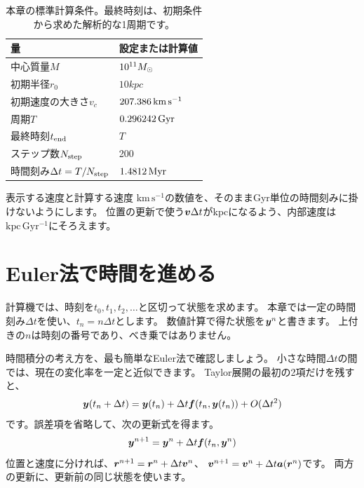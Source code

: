 \begin{table}[!htbp]
\centering
\caption{本章の標準計算条件。最終時刻は、初期条件から求めた解析的な1周期です。}
\label{tab:ch1-parameters}
\begin{tabular}{ll}
\toprule
量 & 設定または計算値\\
\midrule
中心質量$M$ & $10^{11}M_\odot$\\
初期半径$r_0$ & $10\unit{kpc}$\\
初期速度の大きさ$v_c$ & $207.386\,\mathrm{km\,s^{-1}}$\\
周期$T$ & $0.296242\,\mathrm{Gyr}$\\
最終時刻$t_{\rm end}$ & $T$\\
ステップ数$N_{\rm step}$ & 200\\
時間刻み$\Delta t=T/N_{\rm step}$ & $1.4812\,\mathrm{Myr}$\\
\bottomrule
\end{tabular}
\end{table}

\begin{failbox}{表示する速度と計算する速度}
$\mathrm{km\,s^{-1}}$の数値を、そのままGyr単位の時間刻みに掛けないようにします。
位置の更新で使う$\boldsymbol v\Delta t$がkpcになるよう、内部速度は$\mathrm{kpc\,Gyr^{-1}}$にそろえます。
\end{failbox}

\section{Euler法で時間を進める}
\label{sec:ch1-euler}

計算機では、時刻を$t_0,t_1,t_2,\ldots$と区切って状態を求めます。
本章では一定の時間刻み$\Delta t$を使い、$t_n=n\Delta t$とします。
数値計算で得た状態を$\boldsymbol y^n$と書きます。
上付きの$n$は時刻の番号であり、べき乗ではありません。

時間積分の考え方を、最も簡単なEuler法で確認しましょう。
小さな時間$\Delta t$の間では、現在の変化率を一定と近似できます。
Taylor展開の最初の2項だけを残すと、
\begin{equation}
\boldsymbol y(t_n+\Delta t)=\boldsymbol y(t_n)+\Delta t\boldsymbol f(t_n,\boldsymbol y(t_n))+O(\Delta t^2)
\label{eq:ch1-taylor-euler}
\end{equation}
です。誤差項を省略して、次の更新式を得ます。
\begin{equation}
\boldsymbol y^{n+1}=\boldsymbol y^n+\Delta t\boldsymbol f(t_n,\boldsymbol y^n)
\label{eq:ch1-euler-update}
\end{equation}
位置と速度に分ければ、$\boldsymbol r^{n+1}=\boldsymbol r^n+\Delta t\boldsymbol v^n$、
$\boldsymbol v^{n+1}=\boldsymbol v^n+\Delta t\boldsymbol a(\boldsymbol r^n)$です。
両方の更新に、更新前の同じ状態を使います。

